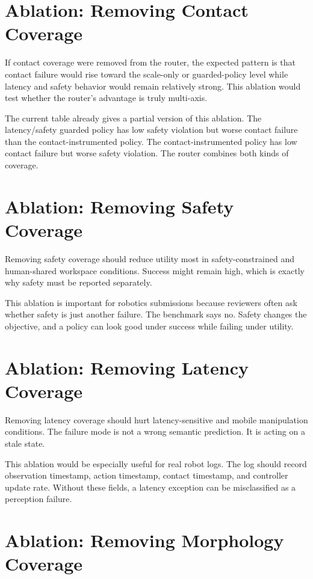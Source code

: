 \section{Ablation: Removing Contact Coverage}

If contact coverage were removed from the router, the expected pattern is that contact failure would rise toward the scale-only or guarded-policy level while latency and safety behavior would remain relatively strong. This ablation would test whether the router's advantage is truly multi-axis.

The current table already gives a partial version of this ablation. The latency/safety guarded policy has low safety violation but worse contact failure than the contact-instrumented policy. The contact-instrumented policy has low contact failure but worse safety violation. The router combines both kinds of coverage.

\section{Ablation: Removing Safety Coverage}

Removing safety coverage should reduce utility most in safety-constrained and human-shared workspace conditions. Success might remain high, which is exactly why safety must be reported separately.

This ablation is important for robotics submissions because reviewers often ask whether safety is just another failure. The benchmark says no. Safety changes the objective, and a policy can look good under success while failing under utility.

\section{Ablation: Removing Latency Coverage}

Removing latency coverage should hurt latency-sensitive and mobile manipulation conditions. The failure mode is not a wrong semantic prediction. It is acting on a stale state.

This ablation would be especially useful for real robot logs. The log should record observation timestamp, action timestamp, contact timestamp, and controller update rate. Without these fields, a latency exception can be misclassified as a perception failure.

\section{Ablation: Removing Morphology Coverage}


